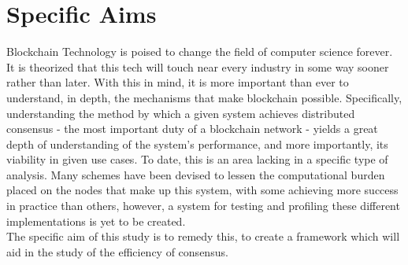 \documentclass[11pt]{article}
\begin{document}
    \section{Specific Aims}
    Blockchain Technology is poised to change the field of computer science forever.
    It is theorized that this tech will touch near every industry in some way sooner rather than later.
    With this in mind, it is more important than ever to understand, in depth, the mechanisms that make blockchain
    possible.
    Specifically, understanding the method by which a given system achieves distributed consensus - the most important
    duty of a blockchain network - yields a great depth of understanding of the system's performance, and more importantly,
    its viability in given use cases.
    To date, this is an area lacking in a specific type of analysis.
    Many schemes have been devised to lessen the computational burden placed on the nodes that make up this system,
    with some achieving more success in practice than others, however, a system for testing and profiling these different
    implementations is yet to be created.\\
    The specific aim of this study is to remedy this, to create a framework which will aid in the study of the efficiency
    of consensus.
\end{document}
